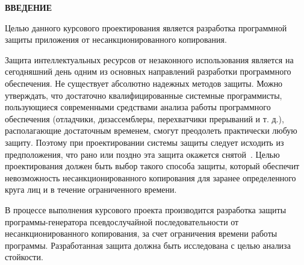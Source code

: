 \newpage

\begin{center}
  \Large{\textbf{ВВЕДЕНИЕ}}
\end{center}

Целью данного курсового проектирования является разработка программной
защиты приложения от несанкционированного копирования.

Защита интеллектуальных ресурсов от незаконного использования является
на сегодняшний день одним из основных направлений разработки
программного обеспечения. Не существует абсолютно надежных методов
защиты. Можно утверждать, что достаточно квалифицированные системные
программисты, пользующиеся современными средствами анализа работы
программного обеспечения (отладчики, дизассемблеры, перехватчики
прерываний и т. д.), располагающие достаточным временем, смогут
преодолеть практически любую защиту. Поэтому при проектировании
системы защиты следует исходить из предположения, что рано или поздно
эта защита окажется снятой~\cite{1}. Целью проектирования должен быть выбор
такого способа защиты, который обеспечит невозможность
несанкционированного копирования для заранее определенного круга лиц и
в течение ограниченного времени.

В процессе выполнения курсового проекта производится разработка защиты
программы-генератора псевдослучайной последовательности от
несанкционированного копирования, за счет ограничения времени работы
программы. Разработанная защита должна быть исследована с целью
анализа стойкости.

\newpage

